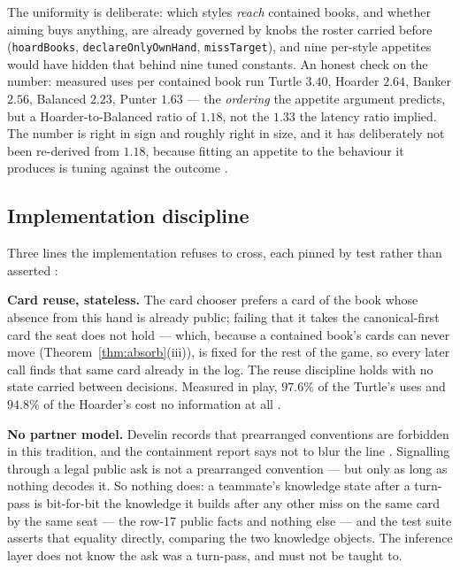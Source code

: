 \documentclass[11pt]{article}
\newcommand{\code}[1]{\texttt{#1}}
\begin{document}
The uniformity is deliberate: which styles \emph{reach} contained books, and
whether aiming buys anything, are already governed by knobs the roster carried
before (\code{hoardBooks}, \code{declareOnlyOwnHand}, \code{missTarget}), and
nine per-style appetites would have hidden that behind nine tuned constants.
An honest check on the number: measured uses per contained book run Turtle
$3.40$, Hoarder $2.64$, Banker $2.56$, Balanced $2.23$, Punter $1.63$ --- the
\emph{ordering} the appetite argument predicts, but a Hoarder-to-Balanced
ratio of $1.18$, not the $1.33$ the latency ratio implied. The number is right
in sign and roughly right in size, and it has deliberately not been re-derived
from $1.18$, because fitting an appetite to the behaviour it produces is
tuning against the outcome \cite{styles}.

\subsection{Implementation discipline}
\label{sec:discipline}

Three lines the implementation refuses to cross, each pinned by test rather
than asserted \cite{contained-ts,tests-bots}:

\textbf{Card reuse, stateless.} The card chooser prefers a card of the book
whose absence from this hand is already public; failing that it takes the
canonical-first card the seat does not hold --- which, because a contained
book's cards can never move (Theorem~\ref{thm:absorb}(iii)), is fixed for the
rest of the game, so every later call finds that same card already in the log.
The reuse discipline holds with no state carried between decisions. Measured
in play, $97.6\%$ of the Turtle's uses and $94.8\%$ of the Hoarder's cost no
information at all \cite{styles}.

\textbf{No partner model.} Develin records that prearranged conventions are
forbidden in this tradition, and the containment report says not to blur the
line \cite{containment,develin}. Signalling through a legal public ask is not
a prearranged convention --- but only as long as nothing decodes it. So
nothing does: a teammate's knowledge state after a turn-pass is bit-for-bit
the knowledge it builds after any other miss on the same card by the same seat
--- the row-17 public facts and nothing else --- and the test suite asserts
that equality directly, comparing the two knowledge objects. The inference
layer does not know the ask was a turn-pass, and must not be taught to.
\end{document}
